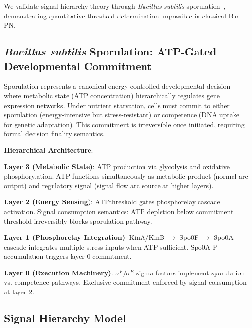 
We validate signal hierarchy theory through \textit{Bacillus subtilis} sporulation~\cite{subtilis2026}, demonstrating quantitative threshold determination impossible in classical Bio-PN.

\subsection{\textit{Bacillus subtilis} Sporulation: ATP-Gated Developmental Commitment}

\vspace{3pt}
\noindent Sporulation represents a canonical energy-controlled developmental decision where metabolic state (ATP concentration) hierarchically regulates gene expression networks. Under nutrient starvation, cells must commit to either sporulation (energy-intensive but stress-resistant) or competence (DNA uptake for genetic adaptation). This commitment is irreversible once initiated, requiring formal decision finality semantics.

\vspace{3pt}
\noindent\textbf{Hierarchical Architecture}:

\vspace{3pt}
\noindent\textbf{Layer 3 (Metabolic State)}: ATP production via glycolysis and oxidative phosphorylation. ATP functions simultaneously as metabolic product (normal arc output) and regulatory signal (signal flow arc source at higher layers).

\vspace{3pt}
\noindent\textbf{Layer 2 (Energy Sensing)}: ATPthreshold gates phosphorelay cascade activation. Signal consumption semantics: ATP depletion below commitment threshold irreversibly blocks sporulation pathway.

\vspace{3pt}
\noindent\textbf{Layer 1 (Phosphorelay Integration)}: KinA/KinB $\to$ Spo0F $\to$ Spo0A cascade integrates multiple stress inputs when ATP sufficient. Spo0A-P accumulation triggers layer 0 commitment.

\vspace{3pt}
\noindent\textbf{Layer 0 (Execution Machinery)}: $\sigma^F$/$\sigma^E$ sigma factors implement sporulation vs. competence pathways. Exclusive commitment enforced by signal consumption at layer 2.

\subsection{Signal Hierarchy Model}

